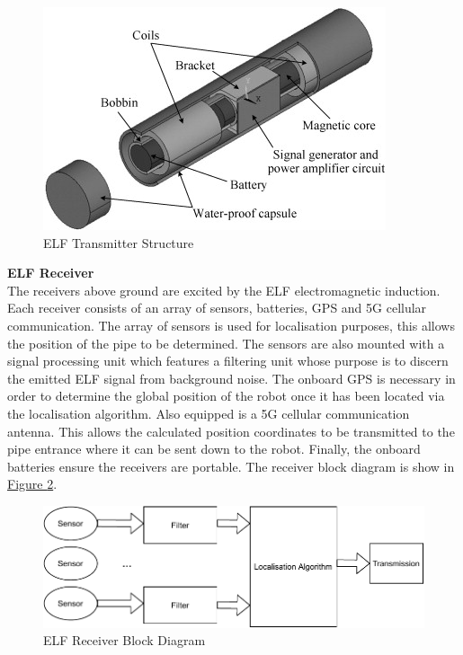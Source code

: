 \documentclass[11pt]{article}		%
\begin{document}
        
         \begin{figure}[h]
			\centering
			\includegraphics[scale=0.7]{ELFtransmitter.jpg}
			\caption{ELF Transmitter Structure} %
			\label{ELF transmitter}
		\end{figure}
		
		
		
		\textbf{ELF Receiver}\\
		The receivers above ground are excited by the ELF electromagnetic induction. Each receiver consists of an array of sensors, batteries, GPS and 5G cellular communication. The array of sensors is used for localisation purposes, this allows the position of the pipe to be determined. The sensors are also mounted with a signal processing unit which features a filtering unit whose purpose is to discern the emitted ELF signal from background noise. The onboard GPS is necessary in order to determine the global position of the robot once it has been located via the localisation algorithm. Also equipped is a 5G cellular communication antenna. This allows the calculated position coordinates to be transmitted to the pipe entrance where it can be sent down to the robot.  Finally, the onboard batteries ensure the receivers are portable. The receiver block diagram is show in \hyperref[ELFrec]{Figure \ref*{ELFrec}}.
	    
	    \begin{figure}[h]
			\centering
			\includegraphics[scale=0.7]{blockreceiever.pdf}
			\caption{ELF Receiver Block Diagram}
			\label{ELFrec}
		\end{figure}
		
\end{document}
